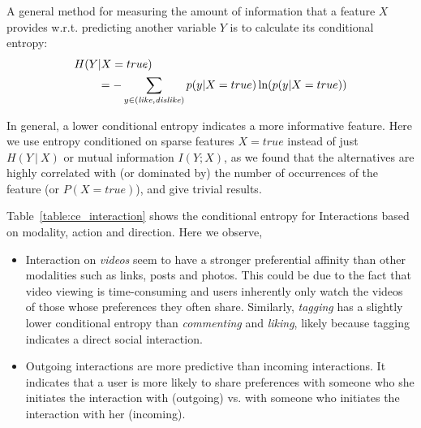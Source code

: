 A general method for measuring the amount of information that a 
feature $X$ provides w.r.t. predicting another variable $Y$ 
is to calculate its conditional entropy:
\begin{align*}
H(Y&|X=true)\\
& = -\sum_{y\in{(\like,\dislike)}} p(y|X=true) \ln( p(y|X=true))
\end{align*}

In general, a lower conditional entropy indicates a more informative
feature. Here we use entropy conditioned on sparse features $X=true$ 
instead of just $H(Y~|~X)$ or mutual information $I(Y; X)$, as we found 
that the alternatives are highly correlated with (or dominated by) the number of 
occurrences of the feature (or $P(X=true)$), and give trivial results. 

Table~\ref{table:ce_interaction} shows the conditional entropy for Interactions based on modality, action and direction. Here we observe,
\begin{itemize}
\item 
Interaction on {\em videos} seem to have a stronger preferential affinity 
than other modalities such as links, posts and photos.  This could be
  due to the fact that video viewing is time-consuming and users
  inherently only watch the videos of those whose preferences they
  often share. Similarly, \textit{tagging} has a slightly lower conditional entropy than
  \textit{commenting} and \textit{liking}, likely because tagging indicates a direct
  social interaction. 
\item Outgoing interactions are more predictive than incoming interactions.
  It indicates that a user is more likely to share preferences with someone who she
  initiates the interaction with (outgoing) vs. with someone who
  initiates the interaction with her (incoming).  
\end{itemize}

